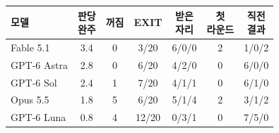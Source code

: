 \setlength{\tabcolsep}{2.4pt}
\small
\begin{tabular}{@{}lcccccc@{}}
\toprule
모델 & \shortstack{판당\\완주} & 꺼짐 & EXIT & \shortstack{받은\\자리} & \shortstack{첫\\라운드} & \shortstack{직전\\결과} \\
\midrule
Fable 5.1 & 3.4 & 0 & 3/20 & 6/0/0 & 2 & 1/0/2 \\
GPT-6 Astra & 2.8 & 0 & 6/20 & 4/2/0 & 0 & 6/0/0 \\
GPT-6 Sol & 2.4 & 1 & 7/20 & 4/1/1 & 0 & 6/1/0 \\
Opus 5.5 & 1.8 & 5 & 6/20 & 5/1/4 & 2 & 3/1/2 \\
GPT-6 Luna & 0.8 & 4 & 12/20 & 0/3/1 & 0 & 7/5/0 \\
\bottomrule
\end{tabular}
